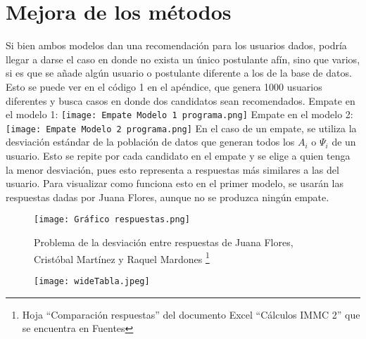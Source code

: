 \documentclass[a4paper]{article}
\begin{document}
\section{Mejora de los métodos}
Si bien ambos modelos dan una recomendación para los usuarios dados, podría llegar a darse el caso en donde no exista un único postulante afín, sino que varios, si es que se añade algún usuario o postulante diferente a los de la base de datos. Esto se puede ver en el código 1 en el apéndice, que genera 1000 usuarios diferentes y busca casos en donde dos candidatos sean recomendados. \newline\newline
Empate en el modelo 1:\newline
\texttt{[image: Empate Modelo 1 programa.png]}
\newline
Empate en el modelo 2:\newline
\texttt{[image: Empate Modelo 2 programa.png]}
\newline
En el caso de un empate, se utiliza la desviación estándar de la población de datos que generan todos los $A_{i}$ o $\Psi_{i}$ de un usuario. Esto se repite por cada candidato en el empate y se elige a quien tenga la menor desviación, pues esto representa a respuestas más similares a las del usuario.   \newline \newline Para visualizar como funciona esto en el primer modelo, se usarán las respuestas dadas por Juana Flores, aunque no se produzca ningún empate.\newline
\begin{figure}[H]
    \begin{center}
    \texttt{[image: Gráfico respuestas.png]}
\end{center}   
    \caption{Problema de la desviación entre respuestas de Juana Flores, Cristóbal Martínez y Raquel Mardones \footnote{Hoja “Comparación respuestas” del documento Excel “Cálculos IMMC 2” que se encuentra en Fuentes}}
\end{figure} 
\begin{figure}[H]
    \begin{center}
    \texttt{[image: wideTabla.jpeg]}
\end{center}   
\end{figure} 
\newline
\end{document}
